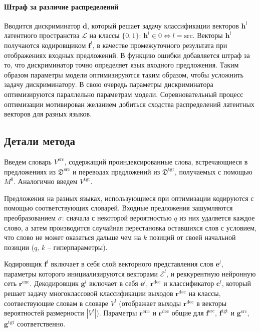 \documentclass[12pt,twoside]{article}
\begin{document}
   \paragraph{Штраф за различие распределений} Вводится дискриминатор $\textbf{d}$, который решает задачу классификации векторов $\textbf{h}^l$ латентного пространства $\mathcal{L}$ на классы $\{0, 1\}$: $\textbf{h}^l \in 0 \Leftrightarrow l = \text{src}$. Векторы $\textbf{h}^l$ получаются кодировщиком $\textbf{f}^{l}$, в качестве промежуточного результата при отображениях входных предложений. В функцию ошибки добавляется штраф за то, что дискриминатор точно определяет язык входного предложения. Таким образом параметры модели оптимизируются таким образом, чтобы усложнить задачу дискриминатору. В свою очередь параметры дискриминатора оптимизируются параллельно параметрам модели. Соревновательный процесс оптимизации мотивирован желанием добиться сходства распределений латентных векторов для разных языков.
   
\subsection{Детали метода}   
   Введем словарь $V^{\text{src}}$, содержащий проиндексированные слова, встречающиеся в предложениях из $\mathfrak{D}^{\text{src}}$ и переводах предложений из  $\mathfrak{D}^{\text{tgt}}$, получаемых с помощью $M^0$. Аналогично введем $V^{\text{tgt}}$. 
   
   Предложения на разных языках, использующиеся при оптимизации кодируются с помощью соответствующих словарей. Входные предложения зашумляются преобразованием $\sigma$: сначала с некоторой вероятностью $q$ из них удаляется каждое слово, а затем производится случайная перестановка оставшихся слов с условием, что слово не может оказаться дальше чем на $k$ позиций от своей начальной позиции ($q$, $k$ -- гиперпараметры).
   
   Кодировщик $\textbf{f}^{l}$ включает в себя слой векторного представления слов $\textbf{e}^{l}$, параметры которого инициализируются векторами $\mathcal{E}^{l}$, и реккурентную нейронную сеть $\textbf{r}^{\text{enc}}$. Декодировщик $\textbf{g}^{l}$ включает в себя $\textbf{e}^{l}$, $\textbf{r}^{\text{dec}}$ и классификатор $\textbf{c}^{l}$, который решает задачу многоклассовой классификации выходов $\textbf{r}^{\text{dec}}$ на классы, соотвествующие словам в словаре $V^{l}$ (отображает выходы $\textbf{r}^{\text{dec}}$ в векторы вероятностей размерности $|V^{l}|$). Параметры $\textbf{r}^{\text{enc}}$ и $\textbf{r}^{\text{dec}}$ общие для $\textbf{f}^{\text{src}}$, $\textbf{f}^{\text{tgt}}$ и $\textbf{g}^{\text{src}}$, $\textbf{g}^{\text{tgt}}$ соответственно.
   
\end{document}
